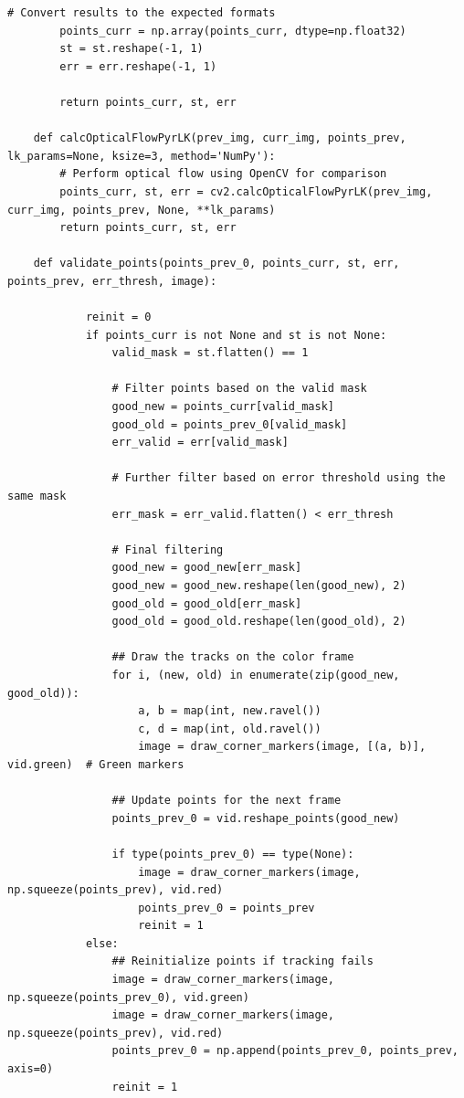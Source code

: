 \documentclass[11pt, conference, letterpaper]{IEEEtran}
\begin{document}
\begin{lstlisting}[style=python, caption={\texttt{lucas\_kanade.py}}, label={lst:lk}]
        # Convert results to the expected formats
        points_curr = np.array(points_curr, dtype=np.float32)
        st = st.reshape(-1, 1)
        err = err.reshape(-1, 1)
    
        return points_curr, st, err
    
    def calcOpticalFlowPyrLK(prev_img, curr_img, points_prev, lk_params=None, ksize=3, method='NumPy'): 
        # Perform optical flow using OpenCV for comparison
        points_curr, st, err = cv2.calcOpticalFlowPyrLK(prev_img, curr_img, points_prev, None, **lk_params)
        return points_curr, st, err
    
    def validate_points(points_prev_0, points_curr, st, err, points_prev, err_thresh, image):
            
            reinit = 0
            if points_curr is not None and st is not None:                
                valid_mask = st.flatten() == 1
                
                # Filter points based on the valid mask
                good_new = points_curr[valid_mask]
                good_old = points_prev_0[valid_mask]
                err_valid = err[valid_mask]
    
                # Further filter based on error threshold using the same mask
                err_mask = err_valid.flatten() < err_thresh
    
                # Final filtering
                good_new = good_new[err_mask]
                good_new = good_new.reshape(len(good_new), 2)
                good_old = good_old[err_mask]
                good_old = good_old.reshape(len(good_old), 2)
                
                ## Draw the tracks on the color frame
                for i, (new, old) in enumerate(zip(good_new, good_old)):
                    a, b = map(int, new.ravel())
                    c, d = map(int, old.ravel())
                    image = draw_corner_markers(image, [(a, b)], vid.green)  # Green markers
    
                ## Update points for the next frame
                points_prev_0 = vid.reshape_points(good_new)
                
                if type(points_prev_0) == type(None):
                    image = draw_corner_markers(image, np.squeeze(points_prev), vid.red)
                    points_prev_0 = points_prev
                    reinit = 1
            else:
                ## Reinitialize points if tracking fails
                image = draw_corner_markers(image, np.squeeze(points_prev_0), vid.green)
                image = draw_corner_markers(image, np.squeeze(points_prev), vid.red)
                points_prev_0 = np.append(points_prev_0, points_prev, axis=0)
                reinit = 1
            

\end{lstlisting}
\end{document}
